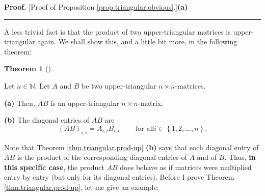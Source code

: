 \documentclass[numbers=enddot,12pt,final,onecolumn,notitlepage]{scrartcl}%
\theoremstyle{definition}
\newtheorem{theo}{Theorem}[section]
\newenvironment{theorem}[1][]
{\begin{theo}[#1]\begin{leftbar}}
{\end{leftbar}\end{theo}}
\newenvironment{proof}[1][Proof]{\noindent\textbf{#1.} }{\ \rule{0.5em}{0.5em}}
\begin{document}
\begin{proof}
[Proof of Proposition \ref{prop.triangular.obvious}.]\textbf{(a)}
\end{proof}

A less trivial fact is that the product of two upper-triangular matrices is
upper-triangular again. We shall show this, and a little bit more, in the
following theorem:

\begin{theorem}
\label{thm.triangular.prod-up}Let $n\in\mathbb{N}$. Let $A$ and $B$ be two
upper-triangular $n\times n$-matrices.

\textbf{(a)} Then, $AB$ is an upper-triangular $n\times n$-matrix.

\textbf{(b)} The diagonal entries of $AB$ are%
\[
\left(  AB\right)  _{i,i}=A_{i,i}B_{i,i}\ \ \ \ \ \ \ \ \ \ \text{for all
}i\in\left\{  1,2,\ldots,n\right\}  .
\]

\end{theorem}

Note that Theorem \ref{thm.triangular.prod-up} \textbf{(b)} says that each
diagonal entry of $AB$ is the product of the corresponding diagonal entries of
$A$ and of $B$. Thus, \textbf{in this specific case}, the product $AB$ does
behave as if matrices were multiplied entry by entry (but only for its
diagonal entries). Before I prove Theorem \ref{thm.triangular.prod-up}, let me
give an example:
\end{document}
